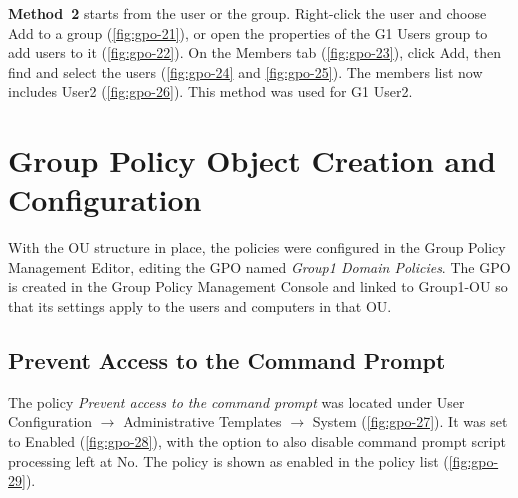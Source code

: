 
\textbf{Method~2} starts from the user or the group. Right-click the user and choose Add to a group (\autoref{fig:gpo-21}), or open the properties of the G1 Users group to add users to it (\autoref{fig:gpo-22}). On the Members tab (\autoref{fig:gpo-23}), click Add, then find and select the users (\autoref{fig:gpo-24} and \autoref{fig:gpo-25}). The members list now includes User2 (\autoref{fig:gpo-26}). This method was used for G1 User2.


\section{Group Policy Object Creation and Configuration}
\label{sec:gpo-gpo}
With the OU structure in place, the policies were configured in the Group Policy Management Editor, editing the GPO named \emph{Group1 Domain Policies}. The GPO is created in the Group Policy Management Console and linked to Group1-OU so that its settings apply to the users and computers in that OU.

\subsection{Prevent Access to the Command Prompt}
\label{sec:gpo-cmd}
The policy \emph{Prevent access to the command prompt} was located under User Configuration $\rightarrow$ Administrative Templates $\rightarrow$ System (\autoref{fig:gpo-27}). It was set to Enabled (\autoref{fig:gpo-28}), with the option to also disable command prompt script processing left at No. The policy is shown as enabled in the policy list (\autoref{fig:gpo-29}).

